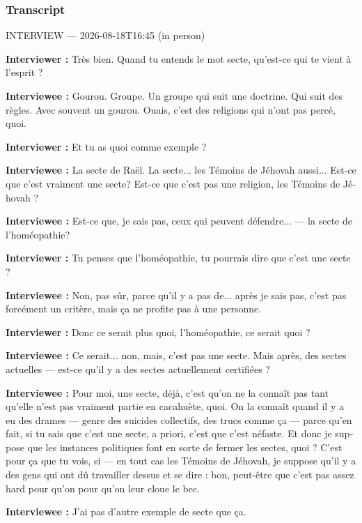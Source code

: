 \subsubsection*{Transcript}
\begin{otherlanguage}{french}
INTERVIEW — 2026-08-18T16:45 (in person)

\textbf{Interviewer :} Très bien. Quand tu entends le mot secte, qu'est-ce qui te vient à l'esprit ?

\textbf{Interviewee :} Gourou. Groupe. Un groupe qui suit une doctrine. Qui suit des règles. Avec souvent un gourou. Ouais, c'est des religions qui n'ont pas percé, quoi.

\textbf{Interviewer :} Et tu as quoi comme exemple ?

\textbf{Interviewee :} La secte de Raël. La secte... les Témoins de Jéhovah aussi... Est-ce que c'est vraiment une secte? Est-ce que c'est pas une religion, les Témoins de Jéhovah ?

\textbf{Interviewee :} Est-ce que, je sais pas, ceux qui peuvent défendre... — la secte de l'homéopathie?

\textbf{Interviewer :} Tu penses que l'homéopathie, tu pourrais dire que c'est une secte ?

\textbf{Interviewee :} Non, pas sûr, parce qu'il y a pas de... après je sais pas, c'est pas forcément un critère, mais ça ne profite pas à une personne.

\textbf{Interviewer :} Donc ce serait plus quoi, l'homéopathie, ce serait quoi ?

\textbf{Interviewee :} Ce serait... non, mais, c'est pas une secte. Mais après, des sectes actuelles — est-ce qu'il y a des sectes actuellement certifiées ?

\textbf{Interviewee :} Pour moi, une secte, déjà, c'est qu'on ne la connaît pas tant qu'elle n'est pas vraiment partie en cacahuète, quoi. On la connaît quand il y a eu des drames — genre des suicides collectifs, des trucs comme ça — parce qu'en fait, si tu sais que c'est une secte, a priori, c'est que c'est néfaste. Et donc je suppose que les instances politiques font en sorte de fermer les sectes, quoi ? C'est pour ça que tu vois, si — en tout cas les Témoins de Jéhovah, je suppose qu'il y a des gens qui ont dû travailler dessus et se dire : bon, peut-être que c'est pas assez hard pour qu'on pour qu'on leur cloue le bec.

\textbf{Interviewee :} J'ai pas d'autre exemple de secte que ça.
\end{otherlanguage}
